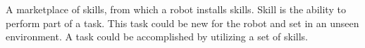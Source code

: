A marketplace of skills, from which a robot installs skills. Skill is the ability to perform part of a task. This task could be new for the robot and set in an unseen environment. A task could be accomplished by utilizing a set of skills.
